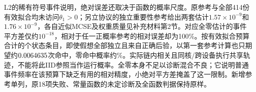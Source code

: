 L2的稀有符号事件说明，绝对误差还取决于函数的概率尺度。原参考与全部414份有效拟合均未访问$\theta_1>0$；另立协议的独立重要性参考给出两套估计$1.57\times10^{-9}$和$1.76\times10^{-9}$，各自近似MCSE及权重质量见补充材料第2节。对应全零估计的事件平方差仅约$10^{-18}$，相对于任一正概率参考的相对误差却为100\%。按有效拟合预算合计的\PBIIDLTwoStates{}个状态条目，即使假想全部独立且来自正确后验，以第一套参考计算也只期望约$0.0064635$次命中，零命中概率约\PBIIDLTwoZero\%。实际链内相关且同核/跨设备执行共享轨迹，不能将此IID参照当作运行概率。全零本身不足以诊断混合不良；它说明普通事件频率在该预算下缺乏有用的相对精度，小绝对平方差掩盖了这一限制。新增参考单列，原18项失败、常量函数的未定诊断及全函数判据保持原样。
